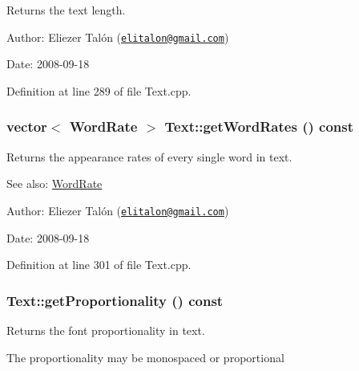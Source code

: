Returns the text length. 

\begin{Desc}
\item[Author:]Eliezer Talón (\href{mailto:elitalon@gmail.com}{\tt elitalon@gmail.com}) \end{Desc}
\begin{Desc}
\item[Date:]2008-09-18 \end{Desc}


Definition at line 289 of file Text.cpp.\hypertarget{class_text_2fd83be91d5ba2c24fd44df45efc92c9}{
\subsubsection[getWordRates]{\setlength{\rightskip}{0pt plus 5cm}vector$<$ {\bf WordRate} $>$ Text::getWordRates () const}}
\label{class_text_2fd83be91d5ba2c24fd44df45efc92c9}


Returns the appearance rates of every single word in text. 

\begin{Desc}
\item[See also:]\hyperlink{_word_rate_8h_e8f43926daba5798edbb3cb94ad07ff7}{WordRate}\end{Desc}
\begin{Desc}
\item[Author:]Eliezer Talón (\href{mailto:elitalon@gmail.com}{\tt elitalon@gmail.com}) \end{Desc}
\begin{Desc}
\item[Date:]2008-09-18 \end{Desc}


Definition at line 301 of file Text.cpp.\hypertarget{class_text_fa8149d9658fd279eb2f6c6c967b3bb5}{
\subsubsection[getProportionality]{ Text::getProportionality () const}}
\label{class_text_fa8149d9658fd279eb2f6c6c967b3bb5}


Returns the font proportionality in text. 

The proportionality may be monospaced or proportional

